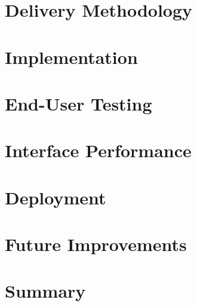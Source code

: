 \section{Delivery Methodology}

\section{Implementation}

\section{End-User Testing}

\section{Interface Performance}

\section{Deployment}

\section{Future Improvements} \label{client-improvements}

\section{Summary} 